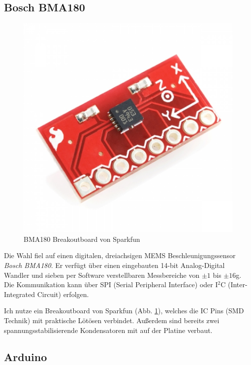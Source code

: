 \documentclass[12pt,a4paper]{scrartcl}
\begin{document}
\subsection{Bosch BMA180}
\begin{figure}[h]
\centering
\includegraphics[scale=.4]{hardwareimages/bma180_breakout.jpg}
\caption{BMA180 Breakoutboard von Sparkfun}
\label{bma180_breakout}
\end{figure}

Die Wahl fiel auf einen digitalen, dreiachsigen MEMS Beschleunigungssensor \textit{Bosch BMA180}. Er verfügt über einen eingebauten 14-bit Analog-Digital Wandler und sieben per Software verstellbaren Messbereiche von $\pm1$ bis $\pm16$g.
Die Kommunikation kann über SPI (Serial Peripheral Interface)  oder I$^2$C (Inter-Integrated Circuit) erfolgen.

Ich nutze ein Breakoutboard von Sparkfun (Abb. \ref{bma180_breakout}), welches die IC Pins (SMD Technik) mit praktische Lötösen verbindet. Außerdem sind bereits zwei spannungsstabilisierende Kondensatoren mit auf der Platine verbaut.

\subsection{Arduino}
\end{document}
